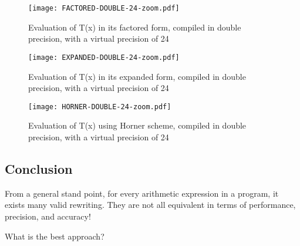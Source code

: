 \begin{figure}[h]
  \center \texttt{[image: FACTORED-DOUBLE-24-zoom.pdf]}
  \caption{Evaluation of T(x) in its factored form, compiled in double
    precision, with a virtual precision of 24}
  \label{fig:factored:double:24:zoom}
\end{figure}

\begin{figure}[h]
  \center \texttt{[image: EXPANDED-DOUBLE-24-zoom.pdf]}
  \caption{Evaluation of T(x) in its expanded form, compiled in double
    precision, with a virtual precision of 24}
  \label{fig:expanded:double:24:zoom}
\end{figure}

\begin{figure}[h]
  \center \texttt{[image: HORNER-DOUBLE-24-zoom.pdf]}
  \caption{Evaluation of T(x) using Horner scheme, compiled in double precision,
    with a virtual precision of 24}
    \label{fig:horner:double:24:zoom}
\end{figure}

\subsection{Conclusion}


From a general stand point, for every arithmetic expression in a program, it exists many valid rewriting. They are not all equivalent in terms of performance, precision, and accuracy!

\begin{question}
What is the best approach?
\end{question}

\FloatBarrier

